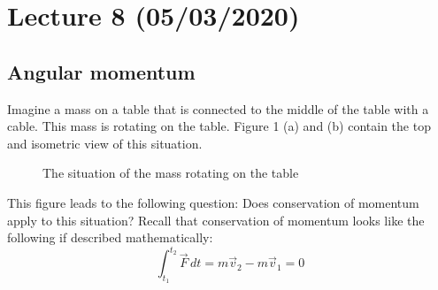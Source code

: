 \documentclass[11pt, a4paper]{article}
\begin{document}
\setcounter{section}{7}
\section{Lecture 8 (05/03/2020)}
\subsection{Angular momentum}
Imagine a mass on a table that is connected to the middle of the table with a cable. 
This mass is rotating on the table. Figure 1 (a) and (b) contain the top and isometric view of this 
situation.

\begin{figure}[h]
  \centering
  \qquad
  \caption{The situation of the mass rotating on the table}
\end{figure}

This figure leads to the following question: Does conservation of momentum apply to this situation? 
Recall that conservation of momentum looks like the following if described mathematically:
\begin{equation}
    \int_{t_1}^{t_2} \vec{F}\,dt = m\vec{v}_2 - m\vec{v}_1 = 0
\end{equation}
\end{document}
